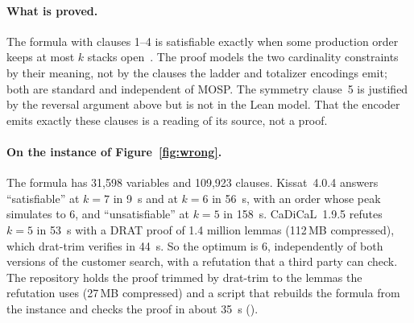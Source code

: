 \paragraph{What is proved.} The formula with clauses 1--4 is satisfiable exactly
when some production order keeps at most $k$ stacks open~. The proof models the two cardinality constraints by
their meaning, not by the clauses the ladder and totalizer encodings emit; both
are standard and independent of MOSP. The symmetry clause~5 is justified by the
reversal argument above but is not in the Lean model. That the encoder emits
exactly these clauses is a reading of its source, not a proof.

\paragraph{On the instance of Figure~\ref{fig:wrong}.} The formula has 31,598
variables and 109,923 clauses. Kissat~4.0.4 answers ``satisfiable'' at $k=7$
in 9~s and at $k=6$ in 56~s, with an order whose peak simulates to 6, and
``unsatisfiable'' at $k=5$ in 158~s. CaDiCaL~1.9.5 refutes $k=5$ in 53~s with
a DRAT proof of 1.4 million lemmas (112\,MB compressed), which drat-trim
verifies in 44~s. So the optimum is 6, independently of both versions of the
customer search, with a refutation that a third party can check. The
repository holds the proof trimmed by drat-trim to the lemmas the refutation
uses (27\,MB compressed) and a script that rebuilds the formula from the
instance and checks the proof in about 35~s
().
